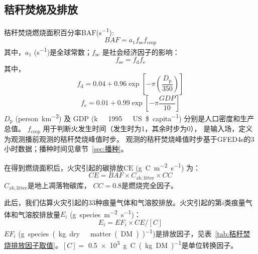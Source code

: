 \subsection{秸秆焚烧及排放}
秸秆焚烧燃烧面积百分率${\mathrm {BAF}}$(\unit{s^{-1}}):
\begin{equation}
    BAF= a_1 f_{\mathrm{se}} f_{\mathrm{crop}}
\end{equation}
其中，$a_1$ (\unit{s^{-1}})是全球常数；$f_{\mathrm{se}}$ 是社会经济因子的影响：
\begin{equation}
    f_{\mathrm{se}} = f_{\mathrm {d}}  f_{\mathrm {e}}
\end{equation}
其中，
\begin{equation}
    f_{\mathrm {d}}  = 0.04 + 0.96\exp\left[-\pi\left(\frac{D_{\mathrm {p}} }{350}\right)\right]
\end{equation}
\begin{equation}
    f_{\mathrm {e}}  = 0.01 + 0.99\exp\left[-\pi\frac{GDP}{10}\right]
\end{equation}
$D_{\mathrm {p}} $ (\unit{person.km^{-2}}) 及 ${\mathrm {GDP}}$ (\unit{k\ 1995\ US\$.capita^{-1}})
分别是人口密度和生产总值。
$f_{\mathrm{crop}}$ 用于判断火发生时间（发生时为1，其余时步为0），
是输入场，定义为观测播前观测的秸秆焚烧峰值时步。
观测的秸秆焚烧峰值时步基于GFED4s的3小时数据；播种时间见章节~\ref{sec:播种}。

在得到燃烧面积后，火灾引起的碳排放${\mathrm {CE}}$ (\unit{g.C.m^{-2}.s^{-1}}) 为：
\begin{equation}
CE=BAF \times C_{\mathrm{ab,litter}} \times CC
\end{equation}
$C_{\mathrm{ab,litter}}$是地上凋落物碳库， $CC=0.8$是燃烧完全因子。

此后，我们估算火灾引起的33种痕量气体和气溶胶排放。火灾引起的第$i$类痕量气体和气溶胶排放量$E_i$ (\unit{g.species.m^{-2}.s^{-1}})：
\begin{equation}
E_{i}=EF_{i} \times CE /[{C}]
\end{equation}
$EF_i$ (\unit{g.species.(kg.dry\ matter(DM))^{-1}})是排放因子，见表~\ref{tab:秸秆焚烧排放因子取值}。$[C]=$ \qty{0.5e3}{g.C.(kg.DM)^{-1}}是单位转换因子。


